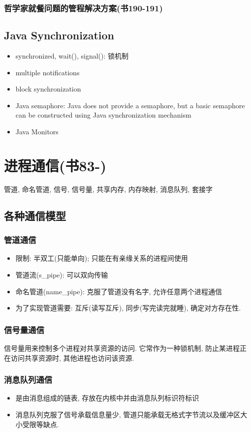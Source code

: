 \documentclass[a4paper, UTF8]{article}
\begin{document}
\subsubsection{哲学家就餐问题的管程解决方案(书190-191)}
\subsection{Java Synchronization}
\begin{itemize}
\item synchronized, wait(), signal(): 锁机制
\item multiple notifications
\item block synchronization
\item Java semaphore: Java does not provide a semaphore, but a basic semaphore can be constructed using Java
synchronization mechanism
\item Java Monitors
\end{itemize}
\newpage
\section{进程通信(书83-)}
管道, 命名管道, 信号, 信号量, 共享内存, 内存映射, 消息队列, 套接字
\subsection{各种通信模型}
\subsubsection{管道通信}
\begin{itemize}
\item 限制: 半双工(只能单向); 只能在有亲缘关系的进程间使用
\item 管道流(s\_pipe): 可以双向传输
\item 命名管道(name\_pipe): 克服了管道没有名字, 允许任意两个进程通信
\item 为了实现管道需要: 互斥(读写互斥), 同步(写完读完就睡), 确定对方存在性.
\end{itemize}
\subsubsection{信号量通信}
信号量用来控制多个进程对共享资源的访问. 它常作为一种锁机制, 防止某进程正在访问共享资源时, 其他进程也访问该资源.
\subsubsection{消息队列通信}
\begin{itemize}
\item 是由消息组成的链表, 存放在内核中并由消息队列标识符标识
\item 消息队列克服了信号承载信息量少, 管道只能承载无格式字节流以及缓冲区大小受限等缺点.
\end{itemize}
\end{document}
